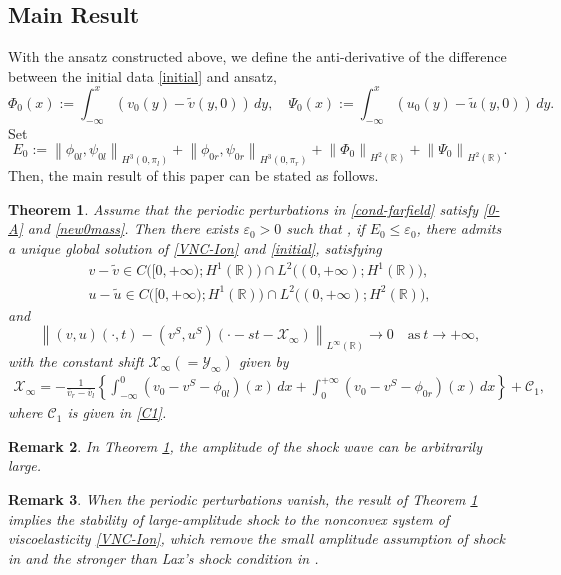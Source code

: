 \documentclass[12pt,reqno]{amsart}
\numberwithin{equation}{section}
\newcommand{\norm}[1]{\left\lVert #1 \right\rVert}
\def\R{\mathbb{R}}
\def\avl{\overline{v}_l}
\def\avr{\overline{v}_r}
\def\vt{\tilde{v}}
\def\ut{\tilde{u}}
\def\X{\mathcal{X}}
\def\Y{\mathcal{Y}}
\newtheorem{theorem}{Theorem}[section]
\newtheorem{remark}[theorem]{Remark}
\begin{document}
\subsection{Main Result}
With the ansatz constructed above, we define the anti-derivative of the difference
between the initial data \eqref{initial} and ansatz,
\begin{equation}\label{initialansatz}
	\Phi_0(x):=\int_{-\infty}^{x}(v_0(y)-\vt(y,0))  \,dy,\quad \Psi_0(x):=\int_{-\infty}^{x}(u_0(y)-\ut(y,0))  \,dy.
\end{equation}
Set
\begin{equation}\label{E0}
	E_0:=\norm{\phi_{0l},\psi_{0l}}_{H^3(0,\pi_l)}+\norm{\phi_{0r},\psi_{0r}}_{H^3(0,\pi_r)}+\norm{\Phi_0}_{H^2(\R)}+\norm{\Psi_0}_{H^2(\R)}.
\end{equation}
Then, the main result of this paper can be stated as follows.
\begin{theorem}\label{mainresult}
	Assume that the periodic perturbations in \eqref{cond-farfield} satisfy \eqref{0-A} and \eqref{new0mass}. Then there exists $\varepsilon_0>0$ such that
	, if $E_0\leq \varepsilon_0$, there admits a unique global solution of \eqref{VNC-Ion} and \eqref{initial}, satisfying
\begin{equation}\label{regularity}
		\begin{aligned}
		v-\vt \in C\Big([0,+\infty);H^1(\R)\Big)\cap L^2\Big((0,+\infty);H^1(\R)\Big),\\
		u-\ut \in C\Big([0,+\infty);H^1(\R)\Big)\cap L^2\Big((0,+\infty);H^2(\R)\Big),
	\end{aligned}
\end{equation}
	and 
	\begin{equation}\label{asymptotic}
		\norm{(v,u)(\cdot,t)-(v^S,u^S)(\cdot-st-\X_{\infty})}_{L^{\infty}(\R)}\to 0 \quad \text{as}~t \to +\infty,
	\end{equation}
	with the constant shift $\X_{\infty}(=\Y_{\infty})$ given by
	\begin{align*}
		\X_{\infty}=-\frac{1}{\avr-\avl}\left\{\int_{-\infty}^{0}(v_0-v^S-\phi_{0l})(x)  \,dx+\int_{0}^{+\infty}(v_0-v^S-\phi_{0r})(x)  \,dx  \right\}+\mathcal{C}_1,
	\end{align*}
	where $\mathcal{C} _1$ is given in \eqref{C1}.
\end{theorem}
\begin{remark}
	In Theorem \ref{mainresult}, the amplitude of the shock wave can be arbitrarily large.
\end{remark}
\begin{remark}
	When the periodic perturbations vanish, the result of Theorem \ref{mainresult} implies  the stability of large-amplitude shock to the nonconvex system of viscoelasticity \eqref{VNC-Ion}, which remove the small amplitude assumption of shock in \cite{InitialModel} and the stronger than Lax's shock condition in \cite{Gaijin}.
\end{remark}
\end{document}
